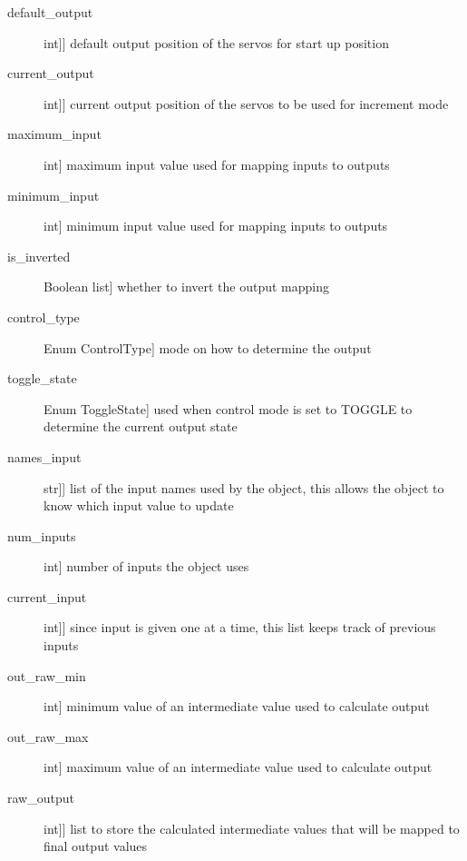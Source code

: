 \documentclass[letterpaper,10pt,english]{sphinxmanual}
\begin{document}
\begin{fulllineitems}
\begin{description}
\item[{default\_output}] \leavevmode{[}{[}int{]}{]}
\sphinxAtStartPar
default output position of the servos for start up position

\item[{current\_output}] \leavevmode{[}{[}int{]}{]}
\sphinxAtStartPar
current output position of the servos to be used for increment mode

\item[{maximum\_input}] \leavevmode{[}int{]}
\sphinxAtStartPar
maximum input value used for mapping inputs to outputs

\item[{minimum\_input}] \leavevmode{[}int{]}
\sphinxAtStartPar
minimum input value used for mapping inputs to outputs

\item[{is\_inverted}] \leavevmode{[}Boolean list{]}
\sphinxAtStartPar
whether to invert the output mapping

\item[{control\_type}] \leavevmode{[}Enum ControlType{]}
\sphinxAtStartPar
mode on how to determine the output

\item[{toggle\_state}] \leavevmode{[}Enum ToggleState{]}
\sphinxAtStartPar
used when control mode is set to TOGGLE to determine the current output state

\item[{names\_input}] \leavevmode{[}{[}str{]}{]}
\sphinxAtStartPar
list of the input names used by the object, this allows the object to know which input value to update

\item[{num\_inputs}] \leavevmode{[}int{]}
\sphinxAtStartPar
number of inputs the object uses

\item[{current\_input}] \leavevmode{[}{[}int{]}{]}
\sphinxAtStartPar
since input is given one at a time, this list keeps track of previous inputs

\item[{out\_raw\_min}] \leavevmode{[}int{]}
\sphinxAtStartPar
minimum value of an intermediate value used to calculate output

\item[{out\_raw\_max}] \leavevmode{[}int{]}
\sphinxAtStartPar
maximum value of an intermediate value used to calculate output

\item[{raw\_output}] \leavevmode{[}{[}int{]}{]}
\sphinxAtStartPar
list to store the calculated intermediate values that will be mapped to final output values


\end{description}
\end{fulllineitems}
\end{document}
